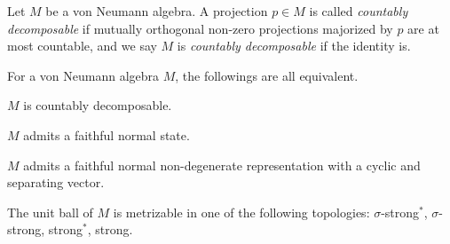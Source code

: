 \documentclass{../../../small}
\begin{document}
\begin{defn}
Let $M$ be a von Neumann algebra.
A projection $p\in M$ is called \emph{countably decomposable} if mutually orthogonal non-zero projections majorized by $p$ are at most countable, and we say $M$ is \emph{countably decomposable} if the identity is.
\end{defn}
\begin{prop}
For a von Neumann algebra $M$, the followings are all equivalent.
\begin{parts}
\item $M$ is countably decomposable.
\item $M$ admits a faithful normal state.
\item $M$ admits a faithful normal non-degenerate representation with a cyclic and separating vector.
\item The unit ball of $M$ is metrizable in one of the following topologies: $\sigma$-strong$^*$, $\sigma$-strong, strong$^*$, strong.
\end{parts}
\end{prop}
\end{document}
